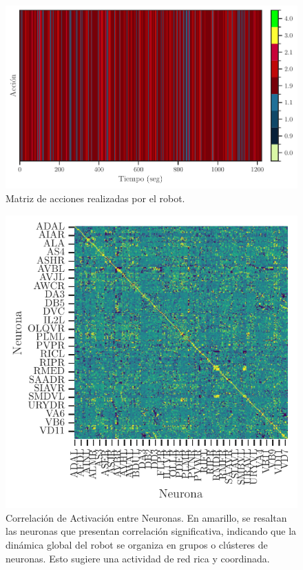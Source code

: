  \begin{figure}[h!]
	\centering\includegraphics[width=\imsize]{accion_robot.pdf}
	\caption[ Matriz de acciones realizadas por el robot]{Matriz de acciones realizadas por el robot.}\label{fig:acciones}
\end{figure}


 \begin{figure}[h!]
	\centering\includegraphics[width=\imsize]{correlacion_robot.pdf}
	\caption[ Correlación de Activación entre Neuronas.]{Correlación de Activación entre Neuronas.  En amarillo, se resaltan las neuronas que presentan correlación significativa, indicando que la dinámica global del robot se organiza en grupos o clústeres de neuronas. Esto sugiere una actividad de red rica y coordinada.}\label{fig:correlacion_robot}
\end{figure}

